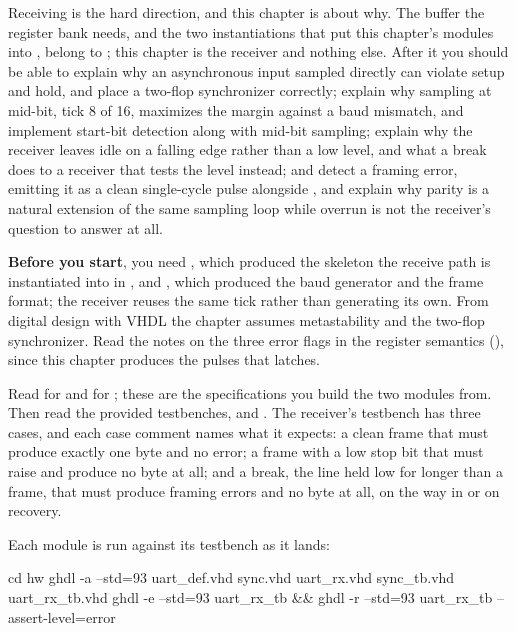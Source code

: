 Receiving is the hard direction, and this chapter is about why. The buffer the register bank
needs, and the two instantiations that put this chapter's modules into , belong to
; this chapter is the receiver and nothing else. After it you should be able to explain
why an asynchronous input sampled directly can violate setup and hold, and place a two-flop
synchronizer correctly; explain why sampling at mid-bit, tick 8 of 16, maximizes the margin
against a baud mismatch, and implement start-bit detection along with mid-bit sampling; explain why
the receiver leaves idle on a falling edge rather than a low level, and what a break does to a
receiver that tests the level instead; and detect a framing error, emitting it as a clean
single-cycle pulse alongside , and explain why parity is a natural extension of the same
sampling loop while overrun is not the receiver's question to answer at all.

\textbf{Before you start}, you need , which produced the  skeleton the
receive path is instantiated into in , and , which produced the baud generator
and the frame format; the receiver reuses the same  tick rather than generating its
own. From digital design with VHDL the chapter assumes metastability and the two-flop synchronizer.
Read the notes on the three error flags in the register semantics (), since
this chapter produces the pulses that  latches.

Read  for  and  for ; these
are the specifications you build the two modules from. Then read the provided testbenches,
 and . The receiver's testbench has three cases, and
each case comment names what it expects: a clean frame that must produce exactly one 
byte and no error; a frame with a low stop bit that must raise  and produce no byte
at all; and a break, the line held low for longer than a frame, that must produce framing errors and
no byte at all, on the way in or on recovery.

Each module is run against its testbench as it lands:

\begin{shell}
cd hw
ghdl -a --std=93 uart_def.vhd sync.vhd uart_rx.vhd sync_tb.vhd uart_rx_tb.vhd
ghdl -e --std=93 uart_rx_tb && ghdl -r --std=93 uart_rx_tb --assert-level=error
\end{shell}

